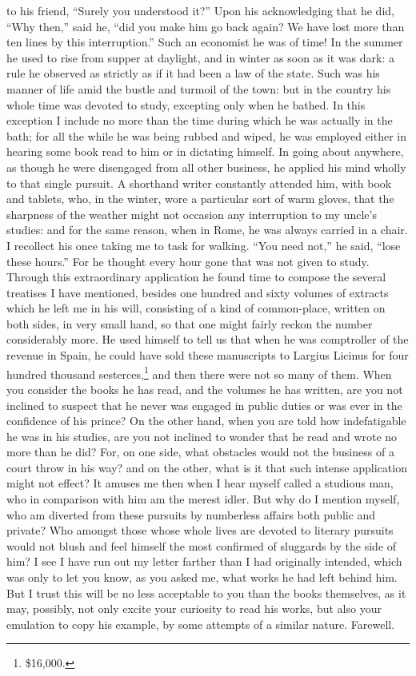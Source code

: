 to his friend, ``Surely you understood it?'' Upon his acknowledging that he
did, ``Why then,'' said he, ``did you make him go back again? We have lost
more than ten lines by this interruption.'' Such an economist he was of
time! In the summer he used to rise from supper at daylight, and in winter
as soon as it was dark: a rule he observed as strictly as if it had been a
law of the state. Such was his manner of life amid the bustle and turmoil
of the town: but in the country his whole time was devoted to study,
excepting only when he bathed. In this exception I include no more than
the time during which he was actually in the bath; for all the while he
was being rubbed and wiped, he was employed either in hearing some book
read to him or in dictating himself. In going about anywhere, as though he
were disengaged from all other business, he applied his mind wholly to
that single pursuit. A shorthand writer constantly attended him, with book
and tablets, who, in the winter, wore a particular sort of warm gloves,
that the sharpness of the weather might not occasion any interruption to
my uncle's studies: and for the same reason, when in Rome, he was always
carried in a chair. I recollect his once taking me to task for walking.
``You need not,'' he said, ``lose these hours.'' For he thought every hour
gone that was not given to study. Through this extraordinary application
he found time to compose the several treatises I have mentioned, besides
one hundred and sixty volumes of extracts which he left me in his will,
consisting of a kind of common-place, written on both sides, in very small
hand, so that one might fairly reckon the number considerably more. He
used himself to tell us that when he was comptroller of the revenue in
Spain, he could have sold these manuscripts to Largius Licinus for four
hundred thousand sesterces,\footnote{\$16,000.} and then there were not so many of them. When
you consider the books he has read, and the volumes he has written, are
you not inclined to suspect that he never was engaged in public duties or
was ever in the confidence of his prince? On the other hand, when you are
told how indefatigable he was in his studies, are you not inclined to
wonder that he read and wrote no more than he did? For, on one side, what
obstacles would not the business of a court throw in his way? and on the
other, what is it that such intense application might not effect? It
amuses me then when I hear myself called a studious man, who in comparison
with him am the merest idler. But why do I mention myself, who am diverted
from these pursuits by numberless affairs both public and private? Who
amongst those whose whole lives are devoted to literary pursuits would not
blush and feel himself the most confirmed of sluggards by the side of him?
I see I have run out my letter farther than I had originally intended,
which was only to let you know, as you asked me, what works he had left
behind him. But I trust this will be no less acceptable to you than the
books themselves, as it may, possibly, not only excite your curiosity to
read his works, but also your emulation to copy his example, by some
attempts of a similar nature. Farewell.

